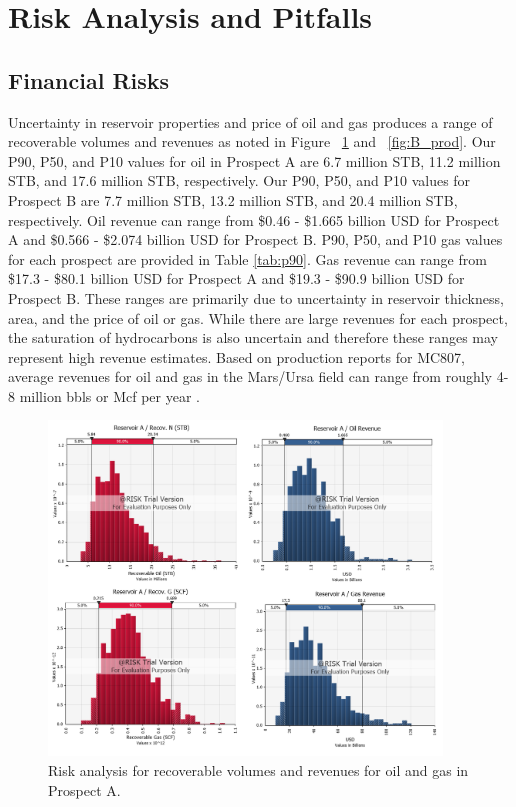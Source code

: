 \documentclass[fleqn]{article}
\begin{document}
\section{Risk Analysis and Pitfalls}
\subsection{Financial Risks}
Uncertainty in reservoir properties and price of oil and gas produces a range of recoverable volumes and revenues as noted in Figure ~\ref{fig:A_prod} and ~\ref{fig:B_prod}. Our P90, P50, and P10 values for oil in Prospect A are 6.7 million STB, 11.2 million STB, and 17.6 million STB, respectively. Our P90, P50, and P10 values for Prospect B are 7.7 million STB, 13.2 million STB, and 20.4 million STB, respectively. Oil revenue can range from \$0.46 - \$1.665 billion USD for Prospect A and \$0.566 - \$2.074 billion USD for Prospect B. P90, P50, and P10 gas values for each prospect are provided in Table \ref{tab:p90}. Gas revenue can range from \$17.3 - \$80.1 billion USD for Prospect A and \$19.3 - \$90.9 billion USD for Prospect B. These ranges are primarily due to uncertainty in reservoir thickness, area, and the price of oil or gas. While there are large revenues for each prospect, the saturation of hydrocarbons is also uncertain and therefore these ranges may represent high revenue estimates. Based on production reports for MC807, average revenues for oil and gas in the Mars/Ursa field can range from roughly 4-8 million bbls or Mcf per year \cite{ESA}.

\begin{figure}[H]
    \centering
    \includegraphics[height=3.5in]{Images/A_production.png}
    \caption{Risk analysis for recoverable volumes and revenues for oil and gas in Prospect A.}
    \label{fig:A_prod}
\end{figure}
\end{document}
